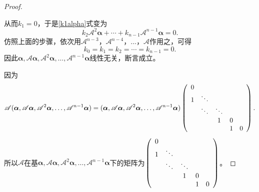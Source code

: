 \begin{enumerate}[1~]
\begin{proof}
\begin{subproof}
从而$k_1=0$，于是\ref{k1alpha}式变为\begin{equation}\label{k2alpha}
k_2\mathscr{A}^2\boldsymbol{\alpha}+\cdots+k_{n-1}\mathscr{A}^{n-1}\boldsymbol{\alpha}=0.
\end{equation}
仿照上面的步骤，依次用$\mathscr{A}^{n-3}$，$\mathscr{A}^{n-4}$，$\dotsc$，$\mathscr{A}$作用之，可得\[
k_0=k_1=k_2=\cdots=k_{n-1}=0.
\]
因此$\boldsymbol{\alpha}, \mathscr{A}\boldsymbol{\alpha}, \mathscr{A}^2\boldsymbol{\alpha}, \dotsc, \mathscr{A}^{n-1}\boldsymbol{\alpha}$线性无关，断言成立。
\end{subproof}
因为\[
\mathscr{A}(\boldsymbol{\alpha}, \mathscr{A}\boldsymbol{\alpha}, \mathscr{A}^2\boldsymbol{\alpha}, \dotsc, \mathscr{A}^{n-1}\boldsymbol{\alpha})=(\boldsymbol{\alpha}, \mathscr{A}\boldsymbol{\alpha}, \mathscr{A}^2\boldsymbol{\alpha}, \dotsc, \mathscr{A}^{n-1}\boldsymbol{\alpha})\left( \begin{array} { c c c c c } { 0 } & { } & { } & { } & { } \\ { 1 } & { \ddots } & { } & { } & { } \\ { } & { \ddots } & { \ddots } & { } & { } \\ { } & { } & { 1 } & { 0 } & { } \\ { } & { } & { } & { 1 } & { 0 } \end{array} \right).
\]
所以$\mathscr{A}$在基$\boldsymbol{\alpha}, \mathscr{A}\boldsymbol{\alpha}, \mathscr{A}^2\boldsymbol{\alpha}, \dotsc, \mathscr{A}^{n-1}\boldsymbol{\alpha}$下的矩阵为$\left( \begin{array} { c c c c c } { 0 } & { } & { } & { } & { } \\ { 1 } & { \ddots } & { } & { } & { } \\ { } & { \ddots } & { \ddots } & { } & { } \\ { } & { } & { 1 } & { 0 } & { } \\ { } & { } & { } & { 1 } & { 0 } \end{array} \right)$。
\end{proof}


\end{enumerate}
